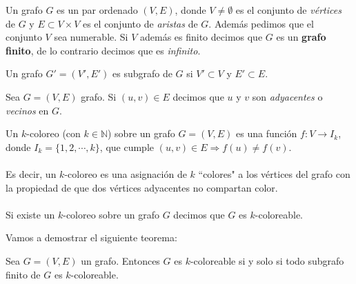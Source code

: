 \documentclass[12pt]{article}
\newenvironment{theorem}[2][Teorema]{\begin{trivlist}
\item[\hskip \labelsep {\bfseries #1}\hskip \labelsep {\bfseries #2}]}{\end{trivlist}}
\newenvironment{definition}[2][Definición]{\begin{trivlist}
\item[\hskip \labelsep {\bfseries #1}\hskip \labelsep {\bfseries #2}]}{\end{trivlist}}
\begin{document}
\begin{definition}{(Grafo)} Un grafo $G$ es un par ordenado $(V, E)$, donde $V \neq \emptyset$ es el conjunto de \textit{vértices} de $G$ y $E \subset V \times V$ es el conjunto de \textit{aristas} de $G$. Además pedimos que el conjunto $V$ sea numerable. Si $V$ además es finito decimos que $G$ es un \textbf{grafo finito}, de lo contrario decimos que es \textit{infinito}.
\end{definition}

\begin{definition}{(Subgrafo)} Un grafo $G' = (V', E')$ es subgrafo de $G$ si $V' \subset V$ y $E' \subset E$. 
\end{definition}

\begin{definition}{(Adyacencia de vértices)} Sea $G = (V,E)$ grafo. Si $(u,v) \in E$ decimos que $u$ y $v$ son \textit{adyacentes} o \textit{vecinos} en $G$.
\end{definition}


\begin{definition}{(k-coloreo)} Un $k$-coloreo (con $k \in \mathbb{N}$) sobre un grafo $G = (V,E)$ es una función $f: V \rightarrow I_k$, donde $I_k = \{1, 2, \cdots , k\} $, que cumple $(u,v) \in E \Rightarrow f(u) \neq f(v)$. \\\\ Es decir, un $k$-coloreo es una asignación de $k$ ``colores" a los vértices del grafo con la propiedad de que dos vértices adyacentes no compartan color. \\\\ Si existe un $k$-coloreo sobre un grafo $G$ decimos que $G$ es $k$-coloreable. 
\end{definition}

Vamos a demostrar el siguiente teorema:
\begin{theorem}{(de De Bruijn–Erdős)}
Sea $G = (V,E)$ un grafo. Entonces $G$ es $k$-coloreable si y solo si todo subgrafo finito de $G$ es $k$-coloreable. 
\end{theorem}
\end{document}
